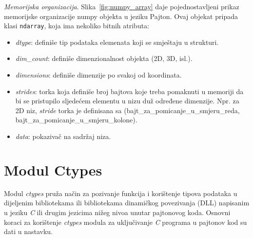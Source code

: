  \textit{Memorijska organizacija}. Slika~\ref{fig:numpy_array} daje pojednostavljeni prikaz memorijske organizacije numpy objekta u jeziku Pajton.  Ovaj objekat pripada klasi \texttt{ndarray}, koja ima nekoliko bitnih atributa: 
 \begin{itemize}
 	\item \textit{dtype}: definiše tip podataka elemenata koji se smještaju u strukturi.
 	\item \textit{dim\_count}: definiše dimenzionalnost objekta (2D, 3D, isl.).  
 	\item \textit{dimensions}: definiše dimenzije po svakoj od koordinata.  
 	\item \textit{strides}: torka koja definiše broj bajtova koje treba pomaknuti u memoriji da bi se pristupilo sljedećem elementu u nizu duž određene dimenzije. Npr. za 2D niz, \textit{stride} torka je definisana sa (bajt\_za\_pomicanje\_u\_smjeru\_reda, bajt\_za\_pomicanje\_u\_smjeru\_kolone). 
 	\item \textit{data}: pokazivač na sadržaj niza. 
 \end{itemize} 
 

\section{Modul Ctypes}

Modul \textit{ctypes} pruža način za pozivanje funkcija i korištenje tipova podataka u dijeljenim  bibliotekama ili bibliotekama dinamičkog povezivanja (DLL) napisanim u jeziku \textit{C} ili drugim jezicima nižeg nivoa unutar pajtonovog koda. Osnovni  koraci za korištenje \textit{ctypes} modula za uključivanje \textit{C} programa u pajtonov kod su dati u nastavku.


